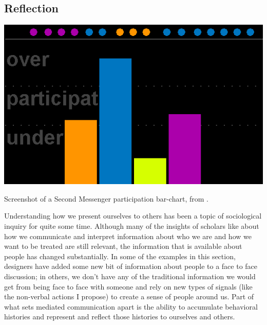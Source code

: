 \documentclass{tufte-handout}
\begin{document}

%


\subsection{Reflection}

\begin{marginfigure}
	\includegraphics{figures/second-messenger.png}
	\caption{Screenshot of a Second Messenger participation bar-chart, from \citep{DiMicco:2007ie}.}
	\label{fig:second-messenger}
\end{marginfigure}





Understanding how we present ourselves to others has been a topic of sociological inquiry for quite some time. Although many of the insights of scholars like \citet{goffman_presentation_1959} about how we communicate and interpret information about who we are and how we want to be treated are still relevant, the information that is available about people has changed substantially. In some of the examples in this section, designers have added some new bit of information about people to a face to face discussion; in others, we don't have any of the traditional information we would get from being face to face with someone and rely on new types of signals (like the non-verbal actions I propose) to create a sense of people around us. Part of what sets mediated communication apart is the ability to accumulate behavioral histories and represent and reflect those histories to ourselves and others.
\end{document}
